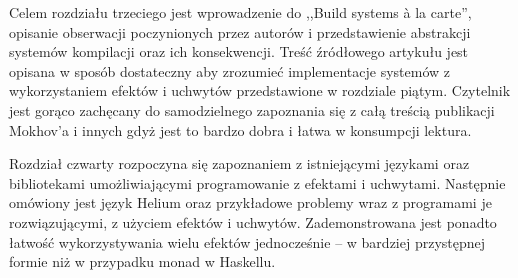 Celem rozdziału trzeciego jest wprowadzenie do ,,Build systems {\`a} la carte'', opisanie obserwacji poczynionych przez autorów i przedstawienie abstrakcji systemów kompilacji oraz ich konsekwencji. Treść źródłowego artykułu jest opisana w sposób dostateczny aby zrozumieć implementacje systemów z wykorzystaniem efektów i uchwytów przedstawione w rozdziale piątym. Czytelnik jest gorąco zachęcany do samodzielnego zapoznania się z całą treścią publikacji Mokhov'a i innych gdyż jest to bardzo dobra i łatwa w konsumpcji lektura.

Rozdział czwarty rozpoczyna się zapoznaniem z istniejącymi językami oraz bibliotekami umożliwiającymi programowanie z efektami i uchwytami. Następnie omówiony jest język Helium oraz przykładowe problemy wraz z programami je rozwiązującymi, z użyciem efektów i uchwytów. Zademonstrowana jest ponadto łatwość wykorzystywania wielu efektów jednocześnie -- w bardziej przystępnej formie niż w przypadku monad w Haskellu.
